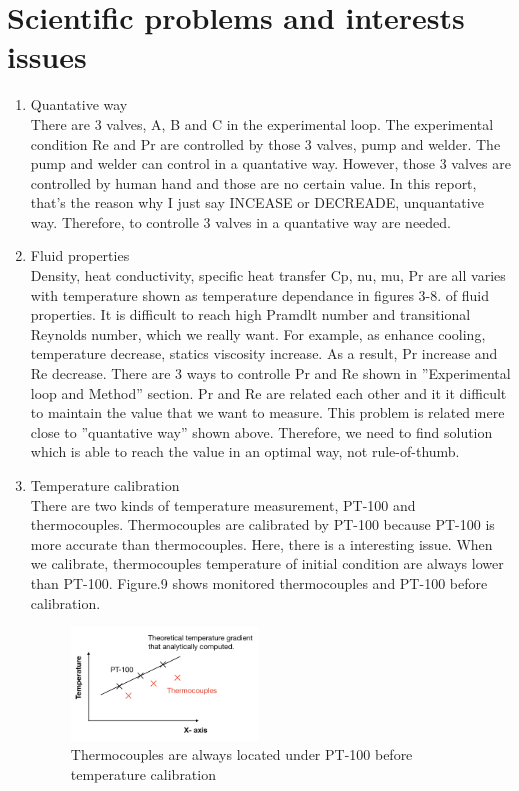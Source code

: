 \documentclass[conference]{IEEEtran}
\begin{document}
\section{Scientific problems and interests issues}
\begin{enumerate}
  \item Quantative way\\
  There are 3 valves, A, B and C in the experimental loop.
  The experimental condition Re and Pr are controlled by those 3 valves, pump and welder.
  The pump and welder can control in a quantative way.
  However, those 3 valves are controlled by human hand and those are no certain value.
  In this report, that's the reason why I just say INCEASE or DECREADE, unquantative way.
  Therefore, to controlle 3 valves in a quantative way are needed.\\
  \item Fluid properties\\
  Density, heat conductivity, specific heat transfer Cp, nu, mu, Pr are all varies with temperature shown as temperature dependance in figures 3-8. of fluid properties.
  It is difficult to reach high Pramdlt number and transitional Reynolds number, which we really want.
  For example, as enhance cooling, temperature decrease, statics viscosity increase.
  As a result, Pr increase and Re decrease.
  There are 3 ways to controlle Pr and Re shown in ''Experimental loop and Method'' section.
  Pr and Re are related each other and it it difficult to maintain the value that we want to measure.
  This problem is related mere close to ''quantative way'' shown above.
  Therefore, we need to find solution which is able to reach the value in an optimal way, not rule-of-thumb.\\
  \item Temperature calibration\\
  There are two kinds of temperature measurement, PT-100 and thermocouples.
  Thermocouples are calibrated by PT-100 because PT-100 is more accurate than thermocouples.
  Here, there is a interesting issue.
  When we calibrate, thermocouples temperature of initial condition are always lower than PT-100.
  Figure.9 shows monitored thermocouples and PT-100 before calibration.
\begin{figure}[h]
\vspace{3zh}
  \centering
  \includegraphics[width=0.47\textwidth,natwidth=750,natheight=300]{fig/thermocouple_calibration.png}
  \caption{Thermocouples are always located under PT-100 before temperature calibration}
  \label{temperature_calibration}
  \vspace{0zh}
\end{figure}


\end{enumerate}
\end{document}

